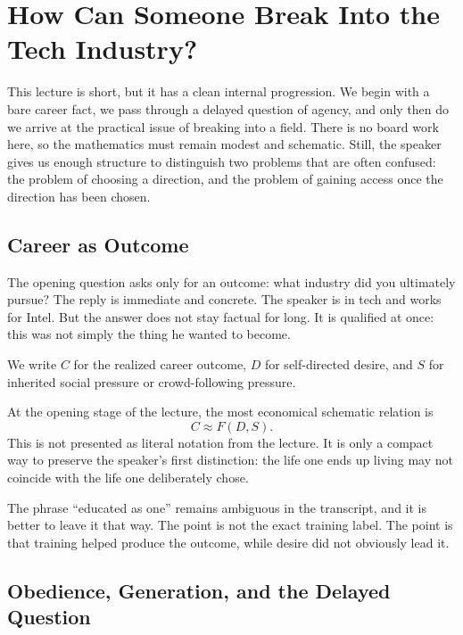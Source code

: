 \chapter{How Can Someone Break Into the Tech Industry?}

This lecture is short, but it has a clean internal progression. We begin with a bare career fact, we pass through a delayed question of agency, and only then do we arrive at the practical issue of breaking into a field. There is no board work here, so the mathematics must remain modest and schematic. Still, the speaker gives us enough structure to distinguish two problems that are often confused: the problem of choosing a direction, and the problem of gaining access once the direction has been chosen.

\section{Career as Outcome}

The opening question asks only for an outcome: what industry did you ultimately pursue? The reply is immediate and concrete. The speaker is in tech and works for Intel. But the answer does not stay factual for long. It is qualified at once: this was not simply the thing he wanted to become.

\begin{definition}
We write \(C\) for the realized career outcome, \(D\) for self-directed desire, and \(S\) for inherited social pressure or crowd-following pressure.
\end{definition}

At the opening stage of the lecture, the most economical schematic relation is
\begin{equation}
C \approx F(D,S).
\end{equation}
This is not presented as literal notation from the lecture. It is only a compact way to preserve the speaker's first distinction: the life one ends up living may not coincide with the life one deliberately chose.

The phrase ``educated as one'' remains ambiguous in the transcript, and it is better to leave it that way. The point is not the exact training label. The point is that training helped produce the outcome, while desire did not obviously lead it.

\section{Obedience, Generation, and the Delayed Question}


